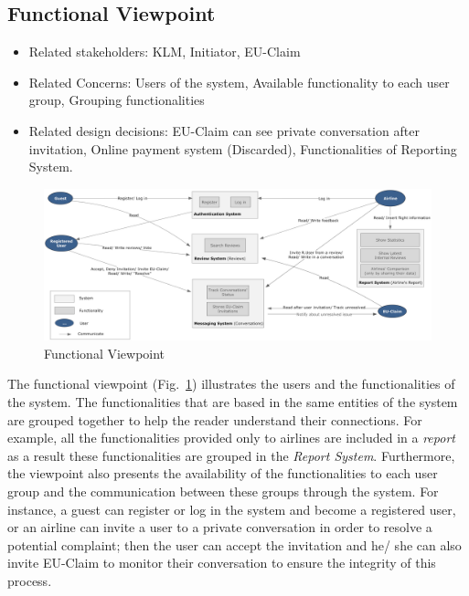 % 

\subsection{Functional Viewpoint}

\begin{itemize}
\item Related stakeholders: KLM, Initiator, EU-Claim
\item Related Concerns: Users of the system, Available functionality to each user group, Grouping functionalities
\item Related design decisions: EU-Claim can see private conversation after invitation, Online payment system (Discarded), Functionalities of Reporting System.
\end{itemize}

\newpage
\begin{landscape}
\begin{figure}
\includegraphics[width=600px]{Functional_Viewpoint.jpg}
\caption{Functional Viewpoint}
\label{fig:functional}
\end{figure}
\end{landscape}

The functional viewpoint (Fig.~\ref{fig:functional}) illustrates the users and the functionalities of the system. The functionalities
 that are based in the same entities of the system are grouped together to help the reader understand their connections. For example, all the functionalities 
 provided only to airlines are included in a {\em report} as a result these functionalities are grouped in the {\em Report System}. Furthermore, the viewpoint also presents the 
 availability of the functionalities to each user group and the communication between these groups through the system. For instance, a guest can register or log in the system and
 become a registered user, or an airline can invite a user to a private conversation in order to resolve a potential complaint; then the user can accept the invitation and he/ she can 
 also invite EU-Claim to monitor their conversation to ensure the integrity of this process.